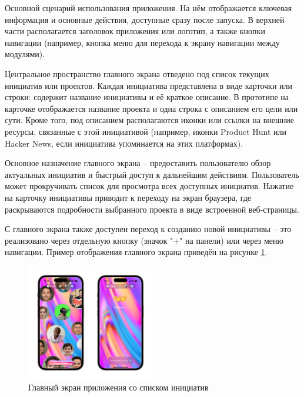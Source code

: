 \documentclass[
    14pt,
    specialist,
    candidate, %
    subf, %
    href,
    dotsinheaders=false
]{disser}
\begin{document}
Основной сценарий использования приложения. На нём отображается ключевая информация и основные действия, доступные сразу после запуска. В верхней части располагается заголовок приложения или логотип, а также кнопки навигации (например, кнопка меню для перехода к экрану навигации между модулями).

Центральное пространство главного экрана отведено под список текущих инициатив или проектов. Каждая инициатива представлена в виде карточки или строки: содержит название инициативы и её краткое описание. В прототипе на карточке отображается название проекта и одна строка с описанием его цели или сути. Кроме того, под описанием располагаются иконки или ссылки на внешние ресурсы, связанные с этой инициативой (например, иконки Product Hunt или Hacker News, если инициатива упоминается на этих платформах).


Основное назначение главного экрана – предоставить пользователю обзор актуальных инициатив и быстрый доступ к дальнейшим действиям. Пользователь может прокручивать список для просмотра всех доступных инициатив. Нажатие на карточку инициативы приводит к переходу на экран браузера, где раскрываются подробности выбранного проекта в виде встроенной веб-страницы.

С главного экрана также доступен переход к созданию новой инициативы – это реализовано через отдельную кнопку (значок "+" на панели) или через меню навигации. Пример отображения главного экрана приведён на рисунке \ref{fig:app-main-flow}.

\begin{figure}[h]
  \centering
  \includegraphics[width=0.5\textwidth]{./assets/app-main-flow.png}
  \caption{Главный экран приложения со списком инициатив}
  \label{fig:app-main-flow}
\end{figure}
\end{document}
